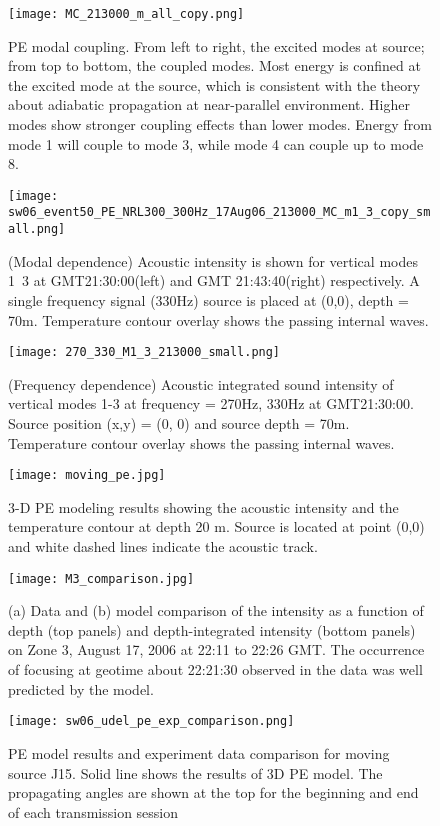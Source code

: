 \begin{figure}[H]
  \centering
  \texttt{[image: MC\_213000\_m\_all\_copy.png]}
  \caption{PE modal coupling. From left to right, the excited modes at source; from top to bottom, the coupled modes. Most energy is confined at the excited mode at the source, which is consistent with the theory about adiabatic propagation at near-parallel environment.  Higher modes show stronger coupling effects than lower modes. Energy from mode 1 will couple to mode 3, while mode 4 can couple up to mode 8. }\label{fig:a2130}
\end{figure}


\begin{figure}[H]
  \centering
  \texttt{[image: sw06\_event50\_PE\_NRL300\_300Hz\_17Aug06\_213000\_MC\_m1\_3\_copy\_small.png]}
  \caption{(Modal dependence) Acoustic intensity is shown for vertical modes 1~3 at GMT21:30:00(left) and GMT 21:43:40(right) respectively.  A single frequency signal (330Hz) source is placed at (0,0), depth = 70m. Temperature contour overlay shows the passing internal waves. }\label{fig:a2130}
\end{figure}


\begin{figure}[H]
  \centering
  \texttt{[image: 270\_330\_M1\_3\_213000\_small.png]}
  \caption{(Frequency dependence) Acoustic integrated sound intensity of vertical modes 1-3 at frequency = 270Hz, 330Hz at GMT21:30:00. Source position (x,y) = (0, 0) and source depth = 70m. Temperature contour overlay shows the passing internal waves. }\label{fig:a2130}
\end{figure}



\begin{figure}[H]
  \centering
  \texttt{[image: moving\_pe.jpg]}
  \caption{3-D PE modeling results showing the acoustic intensity and the temperature contour at depth 20 m.  Source is located at point (0,0) and white dashed lines indicate the acoustic track. }\label{fig:a2130}
\end{figure}

\begin{figure}[H]
  \centering
  \texttt{[image: M3\_comparison.jpg]}
  \caption{(a) Data and (b) model comparison of the intensity as a function of depth (top panels) and depth-integrated intensity (bottom panels) on Zone 3, August 17, 2006 at 22:11 to 22:26 GMT.  The occurrence of focusing at geotime about 22:21:30 observed in the data was well predicted by the model.}\label{fig:a2130}
\end{figure}


\begin{figure}[H]
  \centering
  \texttt{[image: sw06\_udel\_pe\_exp\_comparison.png]}
  \caption{PE model results and experiment data comparison for moving source J15. Solid line shows the results of 3D PE model. The propagating angles are shown at the top for the beginning and end of each transmission session}\label{fig:a2130}
\end{figure}

